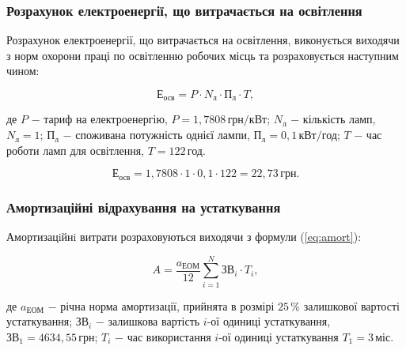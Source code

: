 \vspace{1.5em}

\subsubsection{Розрахунок електроенергії, що витрачається на освітлення}

Розрахунок електроенергії, що витрачається на освітлення, виконується виходячи з норм охорони праці по освітленню робочих місць та розраховується наступним чином:

\begin{equation}\label{eq:osv}
\text{Е}_{\text{осв}} = P \cdot N_{\text{л}} \cdot \text{П}_{\text{л}} \cdot T,
\end{equation}

\noindent де $P$ $-$ тариф на електроенергію, $P = 1,7808 \, \text{грн}/\text{кВт}$; \newline
\hspace*{15pt}$N_{\text{л}}$ $-$ кількість ламп, $N_{\text{л}} = 1$;\newline
\hspace*{15pt}$\text{П}_{\text{л}}$ $-$ споживана потужність однієї лампи, $\text{П}_{\text{л}} = 0,1 \, \text{кВт}/\text{год}$;\newline
\hspace*{15pt}$T$ $-$ час роботи ламп для освітлення, $T = 122 \, \text{год}$.

\[
\text{Е}_{\text{осв}} = 1,7808 \cdot 1 \cdot 0,1 \cdot 122 = 22,73 \, \text{грн}.
\]

\vspace{1.5em}

\subsubsection{Амортизаційні відрахування на устаткування}

Амортизацiйнi витрати розраховуються виходячи з формули (\ref{eq:amort}):

\begin{equation}\label{eq:amort}
A = \frac{a_{\text{ЕОМ}}}{12}\sum_{i=1}^{N}\text{ЗВ}_{i} \cdot T_{i},
\end{equation}

\noindent де $a_{\text{ЕОМ}}$ $-$ річна норма амортизації, прийнята в розмірі $ 25 \, \%$ залишкової\newline 
\hspace*{23pt}вартості устаткування;\newline
\hspace*{23pt}$\text{ЗВ}_{i}$ $-$ залишкова вартість $i$-ої одиниці устаткування, $\text{ЗВ}_{1} = 4634,55 \, \text{грн}$;\newline
\hspace*{23pt}$T_{i}$ $-$ час використання $i$-ої одиниці устаткування $T_{1} = 3 \, \text{міс}$.

